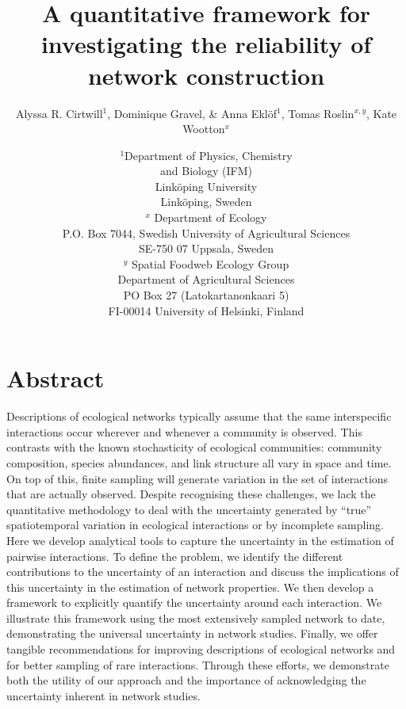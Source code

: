 \documentclass[12pt]{article}
\title{A quantitative framework for investigating the reliability of network construction}
\author{Alyssa R. Cirtwill$^{1}$, Dominique Gravel, \&  Anna Ekl\"{o}f$^{1}$, Tomas Roslin$^{x,y}$, Kate Wootton$^{x}$}
\date{\small$^1$Department of Physics, Chemistry\\ 
and Biology (IFM)\\ 
Link\"{o}ping University\\
Link\"{o}ping, Sweden\\
\medskip $^x$ Department of Ecology\\ P.O. Box 7044, Swedish University of Agricultural Sciences \\ SE-750 07 Uppsala, Sweden \\
\medskip $^y$ Spatial Foodweb Ecology Group\\ Department of Agricultural Sciences \\ PO Box 27 (Latokartanonkaari 5)\\ FI-00014 University of Helsinki, Finland \\
}
\begin{document}
 
\maketitle 
\raggedright
\setlength{\parindent}{15pt} 


\section*{Abstract}

  Descriptions of ecological networks typically assume that the same interspecific interactions occur wherever and whenever a community is observed. This contrasts with the known stochasticity of ecological communities: community composition, species abundances, and link structure all vary in space and time. On top of this, finite sampling will generate variation in the set of interactions that are actually observed. Despite recognising these challenges, we lack the quantitative methodology to deal with the uncertainty generated by “true” spatiotemporal variation in ecological interactions or by incomplete sampling. Here we develop analytical tools to capture the uncertainty in the estimation of pairwise interactions. To define the problem, we identify the different contributions to the uncertainty of an interaction and discuss the implications of this uncertainty in the estimation of network properties. We then develop a framework to explicitly quantify the uncertainty around each interaction. We illustrate this framework using the most extensively sampled network to date, demonstrating the universal uncertainty in network studies. Finally, we offer tangible recommendations for improving descriptions of ecological networks and for better sampling of rare interactions. Through these efforts, we demonstrate both the utility of our approach and the importance of acknowledging the uncertainty inherent in network studies.

\end{document}
